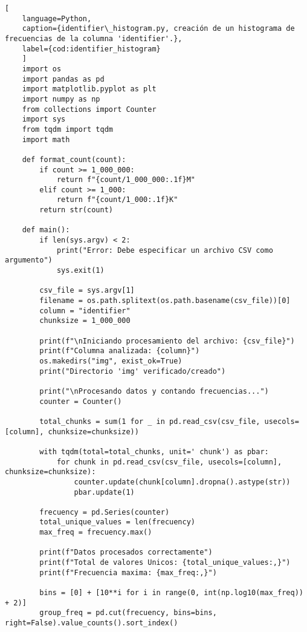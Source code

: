 \begin{lstlisting}[
    language=Python,
    caption={identifier\_histogram.py, creación de un histograma de frecuencias de la columna 'identifier'.},
    label={cod:identifier_histogram}
    ]
    import os
    import pandas as pd
    import matplotlib.pyplot as plt
    import numpy as np
    from collections import Counter
    import sys
    from tqdm import tqdm
    import math

    def format_count(count):
        if count >= 1_000_000:
            return f"{count/1_000_000:.1f}M"
        elif count >= 1_000:
            return f"{count/1_000:.1f}K"
        return str(count)

    def main():
        if len(sys.argv) < 2:
            print("Error: Debe especificar un archivo CSV como argumento")
            sys.exit(1)

        csv_file = sys.argv[1]
        filename = os.path.splitext(os.path.basename(csv_file))[0]
        column = "identifier"  
        chunksize = 1_000_000
        
        print(f"\nIniciando procesamiento del archivo: {csv_file}")
        print(f"Columna analizada: {column}")
        os.makedirs("img", exist_ok=True)
        print("Directorio 'img' verificado/creado")

        print("\nProcesando datos y contando frecuencias...")
        counter = Counter()
        
        total_chunks = sum(1 for _ in pd.read_csv(csv_file, usecols=[column], chunksize=chunksize))
        
        with tqdm(total=total_chunks, unit=' chunk') as pbar:
            for chunk in pd.read_csv(csv_file, usecols=[column], chunksize=chunksize):
                counter.update(chunk[column].dropna().astype(str))
                pbar.update(1)

        frecuency = pd.Series(counter)
        total_unique_values = len(frecuency)
        max_freq = frecuency.max()
        
        print(f"Datos procesados correctamente")
        print(f"Total de valores Unicos: {total_unique_values:,}")
        print(f"Frecuencia maxima: {max_freq:,}")

        bins = [0] + [10**i for i in range(0, int(np.log10(max_freq)) + 2)]  
        group_freq = pd.cut(frecuency, bins=bins, right=False).value_counts().sort_index()


\end{lstlisting}
